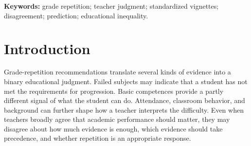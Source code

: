 
\title{}
\author{\authors}

\maketitle\draftlegend
\color{revised}
\begin{abstract}\color{added}
Teachers can agree about the importance of academic difficulties while disagreeing about whether a particular student should repeat a grade. We study that distinction using 22,124 recorded recommendations from 2,705 teachers in a regional survey experiment in Spain. Within-teacher differences are dominated by failed subjects and low basic competences, with evidence that the two signals reinforce each other. Disagreement is concentrated where they conflict: for profiles with many failed subjects but adequate competences, two respondents disagree in 49.1 percent of same-profile pairs. Between-teacher dispersion is also systematic within the task. Its variance is 2.11 times a benchmark that redistributes responses within identical cards and assignment contexts while preserving teachers' exposures. Yet professional characteristics and reported beliefs explain little of this variation. Nested validation on 2,156 complete cases yields out-of-fold $R^2$ values of 3.06 percent for a linear model, 3.01 percent for ridge regression, and 1.48 percent for a tuned random forest. The results locate a consequential boundary in teachers' application of shared academic criteria, while showing why detectable group associations provide a weak basis for predicting an individual teacher's relative recommendation propensity.

\end{abstract}
\noindent\textbf{Keywords:} grade repetition; teacher judgment; standardized vignettes; disagreement; prediction; educational inequality.

\section{Introduction}
Grade-repetition recommendations translate several kinds of evidence into a binary educational judgment. Failed subjects may indicate that a student has not met the requirements for progression. Basic competences provide a partly different signal of what the student can do. Attendance, classroom behavior, and background can further shape how a teacher interprets the difficulty. Even when teachers broadly agree that academic performance should matter, they may disagree about how much evidence is enough, which evidence should take precedence, and whether repetition is an appropriate response.

